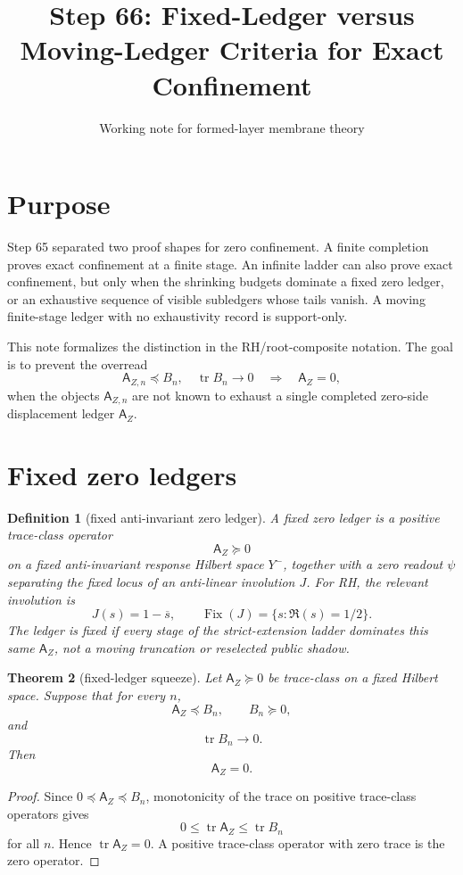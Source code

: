 \documentclass[11pt]{article}
\title{Step 66: Fixed-Ledger versus Moving-Ledger Criteria for Exact Confinement}
\author{Working note for formed-layer membrane theory}
\date{}
\newtheorem{theorem}{Theorem}[section]
\newtheorem{definition}[theorem]{Definition}
\newcommand{\AZ}{\mathsf A_Z}
\newcommand{\Fix}{\operatorname{Fix}}
\newcommand{\tr}{\operatorname{tr}}
\begin{document}
\maketitle

\section{Purpose}
Step 65 separated two proof shapes for zero confinement.  A finite completion proves exact confinement at a finite stage.  An infinite ladder can also prove exact confinement, but only when the shrinking budgets dominate a fixed zero ledger, or an exhaustive sequence of visible subledgers whose tails vanish.  A moving finite-stage ledger with no exhaustivity record is support-only.

This note formalizes the distinction in the RH/root-composite notation.  The goal is to prevent the overread
\[
    \mathsf A_{Z,n} \preceq B_n,\quad \tr B_n\to0
    \quad\Longrightarrow\quad
    \AZ=0,
\]
when the objects \(\mathsf A_{Z,n}\) are not known to exhaust a single completed zero-side displacement ledger \(\AZ\).

\section{Fixed zero ledgers}

\begin{definition}[fixed anti-invariant zero ledger]
A fixed zero ledger is a positive trace-class operator
\[
   \AZ\succeq0
\]
on a fixed anti-invariant response Hilbert space \(Y^-\), together with a zero readout \(\psi\) separating the fixed locus of an anti-linear involution \(J\).  For RH, the relevant involution is
\[
   J(s)=1-\overline{s},
   \qquad
   \Fix(J)=\{s:\Re(s)=1/2\}.
\]
The ledger is fixed if every stage of the strict-extension ladder dominates this same \(\AZ\), not a moving truncation or reselected public shadow.
\end{definition}

\begin{theorem}[fixed-ledger squeeze]
Let \(\AZ\succeq0\) be trace-class on a fixed Hilbert space.  Suppose that for every \(n\),
\[
    \AZ\preceq B_n,
    \qquad B_n\succeq0,
\]
and
\[
    \tr B_n\to0.
\]
Then
\[
    \AZ=0.
\]
\end{theorem}

\begin{proof}
Since \(0\preceq\AZ\preceq B_n\), monotonicity of the trace on positive trace-class operators gives
\[
   0\le \tr\AZ\le \tr B_n
\]
for all \(n\).  Hence \(\tr\AZ=0\).  A positive trace-class operator with zero trace is the zero operator.
\end{proof}
\end{document}
